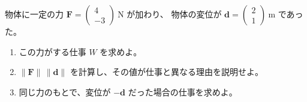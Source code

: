 \documentclass[11pt]{article}
\begin{document}
\problem[一定の力がする仕事]
物体に一定の力 $\boldsymbol F=\begin{pmatrix}4\\-3\end{pmatrix}\ \mathrm N$ が加わり、
物体の変位が $\boldsymbol d=\begin{pmatrix}2\\1\end{pmatrix}\ \mathrm m$ であった。
\begin{enumerate}[label=(\arabic*)]
\item この力がする仕事 $W$ を求めよ。
\item $\|\boldsymbol F\|\,\|\boldsymbol d\|$ を計算し、その値が仕事と異なる理由を説明せよ。
\item 同じ力のもとで、変位が $-\boldsymbol d$ だった場合の仕事を求めよ。
\end{enumerate}
\workspace{65mm}
\end{document}
